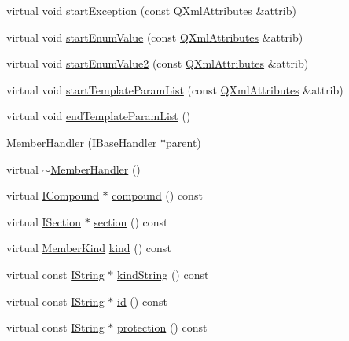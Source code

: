 \begin{DoxyCompactItemize}
\item 
virtual void \hyperlink{class_member_handler_af8158fab4f0b713c91d115a40d20554b}{start\+Exception} (const \hyperlink{class_q_xml_attributes}{Q\+Xml\+Attributes} \&attrib)
\item 
virtual void \hyperlink{class_member_handler_a63d8d7489aca37ff66fccd11a3d222cf}{start\+Enum\+Value} (const \hyperlink{class_q_xml_attributes}{Q\+Xml\+Attributes} \&attrib)
\item 
virtual void \hyperlink{class_member_handler_a5f2403b541c2b90a6fe1d6aaa8d7cd09}{start\+Enum\+Value2} (const \hyperlink{class_q_xml_attributes}{Q\+Xml\+Attributes} \&attrib)
\item 
virtual void \hyperlink{class_member_handler_a6e0fb71096fef87a975b1e11bf07f65b}{start\+Template\+Param\+List} (const \hyperlink{class_q_xml_attributes}{Q\+Xml\+Attributes} \&attrib)
\item 
virtual void \hyperlink{class_member_handler_a87d41e469f6c370dc36936d699ca5d30}{end\+Template\+Param\+List} ()
\item 
\hyperlink{class_member_handler_ad67f513d872cdef2ca7d6faea8cbeb8b}{Member\+Handler} (\hyperlink{class_i_base_handler}{I\+Base\+Handler} $\ast$parent)
\item 
virtual \hyperlink{class_member_handler_af04b42bdd3489505c6aa8fbca4e573b3}{$\sim$\+Member\+Handler} ()
\item 
virtual \hyperlink{class_i_compound}{I\+Compound} $\ast$ \hyperlink{class_member_handler_ac8e266359542c05c319f9521bdf6d458}{compound} () const 
\item 
virtual \hyperlink{class_i_section}{I\+Section} $\ast$ \hyperlink{class_member_handler_aa459d078dc6b819ad834d627eaefa300}{section} () const 
\item 
virtual \hyperlink{class_i_member_ab486b4d2fdebc7a181e8dd0a09170956}{Member\+Kind} \hyperlink{class_member_handler_add3548f7014c5d5d512f699aae899de2}{kind} () const 
\item 
virtual const \hyperlink{class_i_string}{I\+String} $\ast$ \hyperlink{class_member_handler_a9d942d978681ac7dfa0532bde354014b}{kind\+String} () const 
\item 
virtual const \hyperlink{class_i_string}{I\+String} $\ast$ \hyperlink{class_member_handler_a18acd5413fa81670c1b4330b88bf4bc1}{id} () const 
\item 
virtual const \hyperlink{class_i_string}{I\+String} $\ast$ \hyperlink{class_member_handler_a24e2d81dd664314bf674241d4d5bb230}{protection} () const 
\item 

\end{DoxyCompactItemize}
